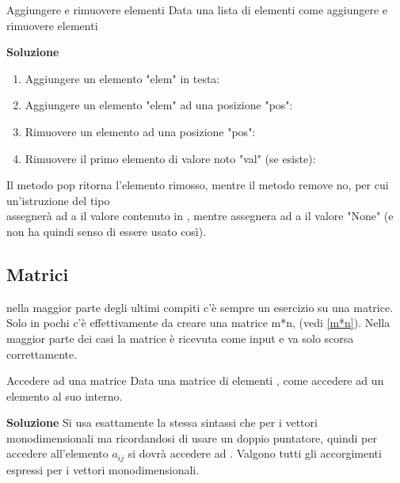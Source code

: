 \documentclass[10pt]{extarticle}
\makeatletter
\newcommand{\<}{\langle}
\renewcommand{\>}{\rangle}
\renewenvironment{proof}[1][\proofname] {\par\pushQED{\qed}
\renewcommand*{\proofname}{Soluzione}
{\normalfont\sffamily\bfseries\topsep6\p@\@plus6\p@\relax #1\@addpunct{.} }}{\popQED\endtrivlist\@endpefalse}
\theoremstyle{mystyle}{\newtheorem*{remark}{Nota}}
\theoremstyle{mystyle}{\newtheorem*{remarks}{Note}}
\theoremstyle{mystyle}{\newtheorem*{example}{Esempio}}
\theoremstyle{mystyle}{\newtheorem*{examples}{Esempi}}
\theoremstyle{definition}{\newtheorem*{exercise}{Exercise}}
\theoremstyle{warn}
\makeatother
\begin{document}
\begin{definition}{Aggiungere e rimuovere elementi}{}
Data una lista di elementi  come aggiungere e rimuovere elementi
\end{definition}
\begin{proof}
\begin{enumerate}
    \item Aggiungere un elemento "elem" in testa: 
    \item Aggiungere un elemento "elem" ad una posizione "pos": 
    \item Rimuovere un elemento ad una posizione "pos": 
    \item Rimuovere il primo elemento di valore noto "val" (se esiste): 
\end{enumerate}
\end{proof}
\begin{remark}
Il metodo pop ritorna l'elemento rimosso, mentre il metodo remove no, per cui un'istruzione del tipo \\ assegnerà ad a il valore contenuto in , mentre  assegnera ad a il valore "None" (e non ha quindi senso di essere usato così).
\end{remark}

\newpage
\subsection{Matrici}
nella maggior parte degli ultimi compiti c'è sempre un esercizio su una matrice. Solo in pochi c'è effettivamente da creare una matrice m*n, (vedi \ref{m*n}). Nella maggior parte dei casi la matrice è ricevuta come input e va solo scorsa correttamente.

\begin{definition}{Accedere ad una matrice}{}
Data una matrice di elementi , come accedere ad un elemento al suo interno.
\end{definition}
\begin{proof}
Si usa esattamente la stessa sintassi che per i vettori monodimensionali ma ricordandosi di usare un doppio puntatore, quindi per accedere all'elemento $a_{ij}$ si dovrà accedere ad . Valgono tutti gli accorgimenti espressi per i vettori monodimensionali.
\end{proof}
\end{document}
